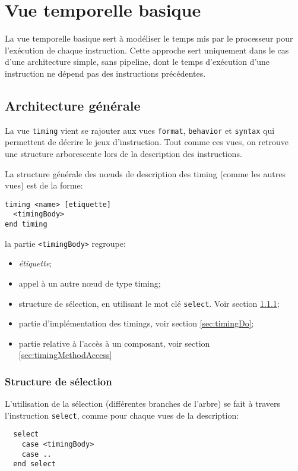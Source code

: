 \chapter{Vue temporelle basique}
\label{chap:timing}
La vue temporelle basique sert à modéliser le temps mis par le processeur pour l'exécution de chaque instruction. Cette approche sert uniquement dans le cas d'une architecture simple, sans pipeline, dont le temps d'exécution d'une instruction ne dépend pas des instructions précédentes.


\section{Architecture générale}
La vue \texttt{timing} vient se rajouter aux vues \texttt{format}, \texttt{behavior} et \texttt{syntax} qui permettent de décrire le jeux d'instruction. Tout comme ces vues, on retrouve une structure arborescente lors de la description des instructions.

La structure générale des nœuds de description des timing (comme les autres vues) est de la forme:
\begin{lstlisting}
timing <name> [etiquette]
  <timingBody>
end timing
\end{lstlisting}

la partie \texttt{<timingBody>} regroupe:
\begin{itemize}
\item \emph{étiquette};
\item appel à un autre nœud de type timing;
\item structure de sélection, en utilisant le mot clé \texttt{select}. Voir section \ref{sec:timingSelect};
\item partie d'implémentation des timings, voir section \ref{sec:timingDo};
\item partie relative à l'accès à un composant, voir section \ref{sec:timingMethodAccess}
\end{itemize}

\subsection{Structure de sélection}
\label{sec:timingSelect}
L'utilisation de la sélection (différentes branches de l'arbre) se fait à travers l'instruction \texttt{select}, comme pour chaque vues de la description:
\begin{lstlisting}
  select 
    case <timingBody>
    case .. 
  end select
\end{lstlisting}


